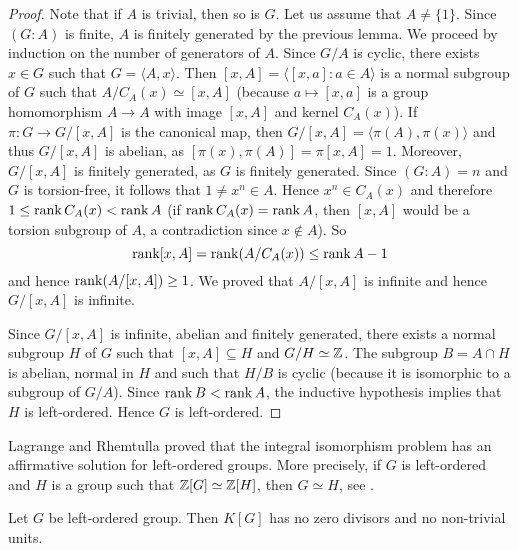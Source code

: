 \begin{proof}
	Note that if $A$ is trivial, then so is $G$. Let us assume that $A\ne\{1\}$. 
    Since $(G:A)$ is finite, $A$ is finitely generated by the previous lemma. 
    We proceed by induction on the number of generators of $A$. Since 
    $G/A$ is cyclic, there exists $x\in G$ such that $G=\langle A,x\rangle$. Then
    $[x,A]=\langle [x,a]:a\in A\rangle$ is a normal subgroup of $G$ such that 
    $A/C_A(x)\simeq [x,A]$ (because $a\mapsto [x,a]$ is a group homomorphism $A\to A$
    with image $[x,A]$ and kernel $C_A(x)$). If $\pi\colon G\to G/[x,A]$ is the canonical map, then
    $G/[x,A]=\langle \pi(A),\pi(x)\rangle$ and thus $G/[x,A]$ is abelian, as 
    $[\pi(x),\pi(A)]=\pi[x,A]=1$. Moreover, $G/[x,A]$ is finitely generated, as $G$
    is finitely generated. Since $(G:A)=n$ and $G$ is torsion-free, it follows that 
    $1\ne x^n\in A$. Hence $x^n\in C_A(x)$ and therefore $1\leq \operatorname{rank} C_A(x)<\operatorname{rank} A$ (if $\operatorname{rank}
    C_A(x)=\operatorname{rank} A$, then $[x,A]$ would be a torsion subgroup of $A$, a contradiction
    since $x\not\in A$). So 
    \[
    \operatorname{rank}[x,A]=\operatorname{rank} (A/C_A(x))\leq\operatorname{rank} A-1
    \]
    and hence $\operatorname{rank} (A/[x,A])\geq 1$. We proved that $A/[x,A]$ is infinite and hence 
    $G/[x,A]$ is infinite. 

    Since $G/[x,A]$ is infinite, abelian and finitely generated, there exists a normal subgroup
    $H$ of $G$ such that $[x,A]\subseteq H$ and $G/H\simeq\mathbb{Z}$. The subgroup 
    $B=A\cap H$ is abelian, normal in $H$ and such that $H/B$ is cyclic
    (because it is isomorphic to a subgroup of $G/A$). Since $\operatorname{rank} B<\operatorname{rank} A$, the inductive hypothesis implies that $H$ is left-ordered. Hence $G$ is left-ordered. 
\end{proof}

Lagrange and Rhemtulla proved that the integral isomorphism problem 
has an affirmative solution for left-ordered groups. More precisely,
if $G$ is left-ordered and $H$ is a group such that $\mathbb{Z}[G]\simeq\mathbb{Z}[H]$, then
$G\simeq H$, see \cite{MR240183}.

\begin{theorem}
	Let $G$ be left-ordered group. Then $K[G]$ has no zero divisors 
	and no non-trivial units. 
\end{theorem}

